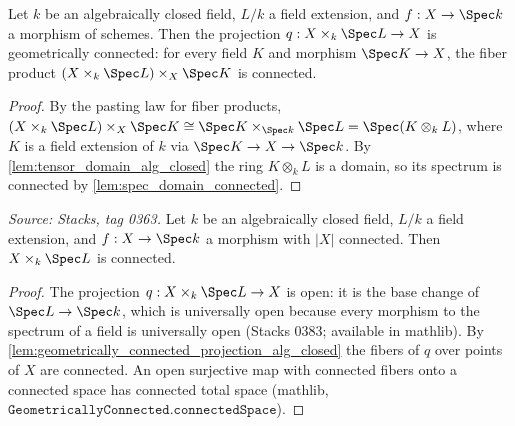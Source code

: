 \begin{lemma}

  \label{lem:geometrically_connected_projection_alg_closed}
  Let \(k\) be an algebraically closed field, \(L/k\) a field extension,
  and \(f : X \to \Spec k\) a morphism of schemes. Then the projection
  \(q : X \times_k \Spec L \to X\) is geometrically connected: for every
  field \(K\) and morphism \(\Spec K \to X\), the fiber product
  \((X \times_k \Spec L) \times_X \Spec K\) is connected.
\end{lemma}
\begin{proof}
  \leanok
  By the pasting law for fiber products,
  \((X \times_k \Spec L) \times_X \Spec K \cong \Spec K \times_{\Spec k}
  \Spec L = \Spec (K \otimes_k L)\), where \(K\) is a field extension of
  \(k\) via \(\Spec K \to X \to \Spec k\). By
  \cref{lem:tensor_domain_alg_closed} the ring \(K \otimes_k L\) is a
  domain, so its spectrum is connected by
  \cref{lem:spec_domain_connected}.
\end{proof}

\begin{lemma}

  \label{lem:connected_base_change_alg_closed}
  \textit{Source: Stacks, tag 0363.}
  Let \(k\) be an algebraically closed field, \(L/k\) a field extension,
  and \(f : X \to \Spec k\) a morphism with \(|X|\) connected. Then
  \(X \times_k \Spec L\) is connected.
\end{lemma}
\begin{proof}
  \leanok
  The projection \(q : X \times_k \Spec L \to X\) is open: it is the
  base change of \(\Spec L \to \Spec k\), which is universally open
  because every morphism to the spectrum of a field is universally open
  (Stacks 0383; available in mathlib). By
  \cref{lem:geometrically_connected_projection_alg_closed} the
  fibers of \(q\) over points of \(X\) are connected. An open
  surjective map with connected fibers onto a connected space has
  connected total space (mathlib,
  \(\texttt{GeometricallyConnected.connectedSpace}\)).
\end{proof}

